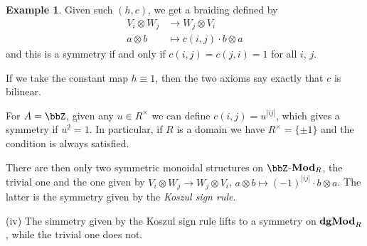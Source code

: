 \documentclass[a4paper,11pt,oneside,openany]{scrbook}
\newcommand{\catname}[1]{{\normalfont\textbf{#1}}}
\newcommand{\Mod}{\catname{Mod}}
\newcommand{\dgMod}{\catname{dgMod}}
\theoremstyle{definition}
\theoremstyle{definition}
\newtheorem{exmp}[thm]{Example}
\begin{document}
\begin{exmp}
Given such $(h,c)$, we get a braiding defined by
\begin{align*}
    V_i\otimes W_j &\rightarrow W_j\otimes V_i \\
    a\otimes b &\mapsto c(i,j)\cdot b\otimes a
\end{align*}
and this is a symmetry if and only if $c(i,j)=c(j,i)=1$ for all $i$, $j$.

If we take the constant map $h\equiv 1$, then the two axioms say exactly that $c$ is bilinear.

For $A=\bbZ$, given any $u\in R^\times$ we can define $c(i,j)=u^{|ij|}$, which gives a symmetry if $u^2=1$. In particular, if $R$ is a domain we have $R^\times=\{\pm 1\}$ and the condition is always satisfied.

There are then only two symmetric monoidal structures on $\bbZ$-$\Mod_R$, the trivial one and the one given by $V_i\otimes W_j\rightarrow W_j\otimes V_i$, $a\otimes b\mapsto (-1)^{|ij|}\cdot b\otimes a$. The latter is the symmetry given by the \emph{Koszul sign rule}.

\item[(iv)] The simmetry given by the Koszul sign rule lifts to a symmetry on $\dgMod_R$, while the trivial one does not.
\end{exmp}
\end{document}
